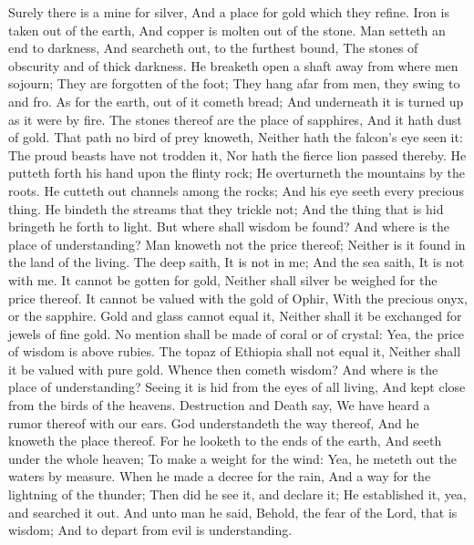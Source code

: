 Surely there is a mine for silver, And a place for gold which they refine.  Iron is taken out of the earth, And copper is molten out of the stone.  Man setteth an end to darkness, And searcheth out, to the furthest bound, The stones of obscurity and of thick darkness.  He breaketh open a shaft away from where men sojourn; They are forgotten of the foot; They hang afar from men, they swing to and fro.  As for the earth, out of it cometh bread; And underneath it is turned up as it were by fire.  The stones thereof are the place of sapphires, And it hath dust of gold.  That path no bird of prey knoweth, Neither hath the falcon’s eye seen it:  The proud beasts have not trodden it, Nor hath the fierce lion passed thereby.  He putteth forth his hand upon the flinty rock; He overturneth the mountains by the roots.  He cutteth out channels among the rocks; And his eye seeth every precious thing.  He bindeth the streams that they trickle not; And the thing that is hid bringeth he forth to light.  But where shall wisdom be found? And where is the place of understanding?  Man knoweth not the price thereof; Neither is it found in the land of the living.  The deep saith, It is not in me; And the sea saith, It is not with me.  It cannot be gotten for gold, Neither shall silver be weighed for the price thereof.  It cannot be valued with the gold of Ophir, With the precious onyx, or the sapphire.  Gold and glass cannot equal it, Neither shall it be exchanged for jewels of fine gold.  No mention shall be made of coral or of crystal: Yea, the price of wisdom is above rubies.  The topaz of Ethiopia shall not equal it, Neither shall it be valued with pure gold.  Whence then cometh wisdom? And where is the place of understanding?  Seeing it is hid from the eyes of all living, And kept close from the birds of the heavens.  Destruction and Death say, We have heard a rumor thereof with our ears.  God understandeth the way thereof, And he knoweth the place thereof.  For he looketh to the ends of the earth, And seeth under the whole heaven;  To make a weight for the wind: Yea, he meteth out the waters by measure.  When he made a decree for the rain, And a way for the lightning of the thunder;  Then did he see it, and declare it; He established it, yea, and searched it out.  And unto man he said, Behold, the fear of the Lord, that is wisdom; And to depart from evil is understanding. 

